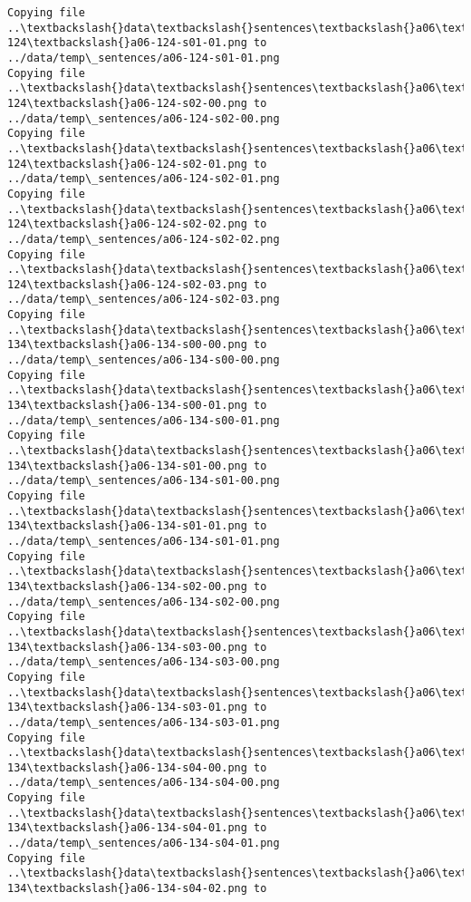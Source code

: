 \documentclass[11pt]{article}
\begin{document}
\begin{Verbatim}[commandchars=\\\{\}]
Copying file ..\textbackslash{}data\textbackslash{}sentences\textbackslash{}a06\textbackslash{}a06-124\textbackslash{}a06-124-s01-01.png to
../data/temp\_sentences/a06-124-s01-01.png
Copying file ..\textbackslash{}data\textbackslash{}sentences\textbackslash{}a06\textbackslash{}a06-124\textbackslash{}a06-124-s02-00.png to
../data/temp\_sentences/a06-124-s02-00.png
Copying file ..\textbackslash{}data\textbackslash{}sentences\textbackslash{}a06\textbackslash{}a06-124\textbackslash{}a06-124-s02-01.png to
../data/temp\_sentences/a06-124-s02-01.png
Copying file ..\textbackslash{}data\textbackslash{}sentences\textbackslash{}a06\textbackslash{}a06-124\textbackslash{}a06-124-s02-02.png to
../data/temp\_sentences/a06-124-s02-02.png
Copying file ..\textbackslash{}data\textbackslash{}sentences\textbackslash{}a06\textbackslash{}a06-124\textbackslash{}a06-124-s02-03.png to
../data/temp\_sentences/a06-124-s02-03.png
Copying file ..\textbackslash{}data\textbackslash{}sentences\textbackslash{}a06\textbackslash{}a06-134\textbackslash{}a06-134-s00-00.png to
../data/temp\_sentences/a06-134-s00-00.png
Copying file ..\textbackslash{}data\textbackslash{}sentences\textbackslash{}a06\textbackslash{}a06-134\textbackslash{}a06-134-s00-01.png to
../data/temp\_sentences/a06-134-s00-01.png
Copying file ..\textbackslash{}data\textbackslash{}sentences\textbackslash{}a06\textbackslash{}a06-134\textbackslash{}a06-134-s01-00.png to
../data/temp\_sentences/a06-134-s01-00.png
Copying file ..\textbackslash{}data\textbackslash{}sentences\textbackslash{}a06\textbackslash{}a06-134\textbackslash{}a06-134-s01-01.png to
../data/temp\_sentences/a06-134-s01-01.png
Copying file ..\textbackslash{}data\textbackslash{}sentences\textbackslash{}a06\textbackslash{}a06-134\textbackslash{}a06-134-s02-00.png to
../data/temp\_sentences/a06-134-s02-00.png
Copying file ..\textbackslash{}data\textbackslash{}sentences\textbackslash{}a06\textbackslash{}a06-134\textbackslash{}a06-134-s03-00.png to
../data/temp\_sentences/a06-134-s03-00.png
Copying file ..\textbackslash{}data\textbackslash{}sentences\textbackslash{}a06\textbackslash{}a06-134\textbackslash{}a06-134-s03-01.png to
../data/temp\_sentences/a06-134-s03-01.png
Copying file ..\textbackslash{}data\textbackslash{}sentences\textbackslash{}a06\textbackslash{}a06-134\textbackslash{}a06-134-s04-00.png to
../data/temp\_sentences/a06-134-s04-00.png
Copying file ..\textbackslash{}data\textbackslash{}sentences\textbackslash{}a06\textbackslash{}a06-134\textbackslash{}a06-134-s04-01.png to
../data/temp\_sentences/a06-134-s04-01.png
Copying file ..\textbackslash{}data\textbackslash{}sentences\textbackslash{}a06\textbackslash{}a06-134\textbackslash{}a06-134-s04-02.png to

\end{Verbatim}
\end{document}
